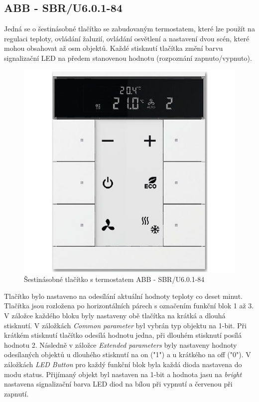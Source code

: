 \subsection{ABB - SBR/U6.0.1-84}
Jedná se o šestinásobné tlačítko se zabudovaným termostatem, které lze použít na regulaci teploty, ovládání žaluzií, ovládání osvětlení a nastavení dvou scén, které mohou obsahovat až osm objektů. Každé stisknutí tlačítka změní barvu signalizační LED na předem stanovenou hodnotu (rozpoznání zapnuto/vypnuto). \cite{ABB}

\begin{figure}[!ht]
  \begin{center}
    \includegraphics[scale=1.6]{obrazky/ABB.jpg}
  \end{center}
  \caption[Šestinásobné tlačítko s termostatem ABB - SBR/U6.0.1-84 \cite{ABB}]{Šestinásobné tlačítko s termostatem ABB - SBR/U6.0.1-84 \cite{ABB}}
  \label{fig:Šestinásobné tlačítko s termostatem ABB SBR/U6.0.1-84}
\end{figure}
Tlačítko bylo nastaveno na odesílání aktuální hodnoty teploty co deset minut. Tlačítka jsou rozložena po horizontálních párech s označením funkční blok 1 až 3. V záložce každého bloku byly nastaveny obě tlačítka na krátká a dlouhá stisknutí. V záložkách  \textit{Common parameter} byl vybrán typ objektu na 1-bit. Při krátkém stisknutí tlačítko odesílá hodnotu jedna, při dlouhém stisknutí posílá hodnotu 2. Následně v záložce \textit{Extended parameters} byly nastaveny hodnoty odesílaných objektů u dlouhého stisknutí na on ("1") a u krátkého na off ("0").
V záložkách \textit{LED Button} pro každý funkční blok byla každá dioda nastavena do modu status. Přijímaný objekt byl nastaven na 1-bit a hodnota jasu na \textit{bright} nastavena signalizační barva LED diod na bílou při vypnutí a červenou při zapnutí. 
